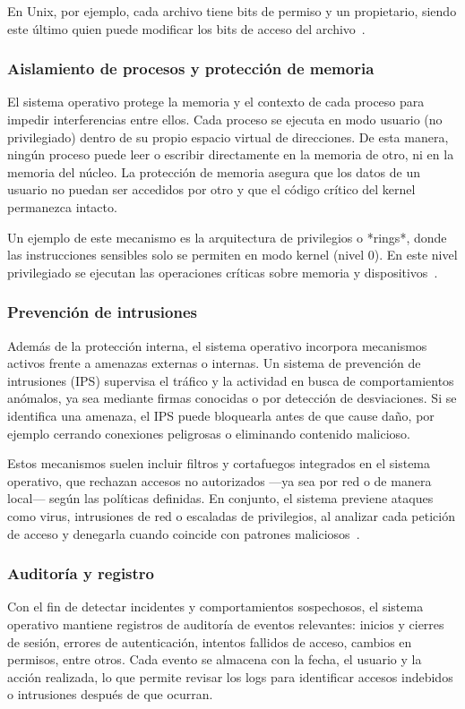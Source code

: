 En Unix, por ejemplo, cada archivo tiene bits de permiso y un propietario, siendo este último quien puede modificar los bits de acceso del archivo~\citep{columbia2008}.
\subsubsection{Aislamiento de procesos y protección de memoria}
El sistema operativo protege la memoria y el contexto de cada proceso para impedir interferencias entre ellos. Cada proceso se ejecuta en modo usuario (no privilegiado) dentro de su propio espacio virtual de direcciones.  
De esta manera, ningún proceso puede leer o escribir directamente en la memoria de otro, ni en la memoria del núcleo.  
La protección de memoria asegura que los datos de un usuario no puedan ser accedidos por otro y que el código crítico del kernel permanezca intacto.  

Un ejemplo de este mecanismo es la arquitectura de privilegios o *rings*, donde las instrucciones sensibles solo se permiten en modo kernel (nivel 0).  
En este nivel privilegiado se ejecutan las operaciones críticas sobre memoria y dispositivos~\citep{princeton2018}.

\subsubsection{Prevención de intrusiones}
Además de la protección interna, el sistema operativo incorpora mecanismos activos frente a amenazas externas o internas.  
Un sistema de prevención de intrusiones (IPS) supervisa el tráfico y la actividad en busca de comportamientos anómalos, ya sea mediante firmas conocidas o por detección de desviaciones.  
Si se identifica una amenaza, el IPS puede bloquearla antes de que cause daño, por ejemplo cerrando conexiones peligrosas o eliminando contenido malicioso.  

Estos mecanismos suelen incluir filtros y cortafuegos integrados en el sistema operativo, que rechazan accesos no autorizados —ya sea por red o de manera local— según las políticas definidas.  
En conjunto, el sistema previene ataques como virus, intrusiones de red o escaladas de privilegios, al analizar cada petición de acceso y denegarla cuando coincide con patrones maliciosos~\citep{ibm2019}.

\subsubsection{Auditoría y registro}
Con el fin de detectar incidentes y comportamientos sospechosos, el sistema operativo mantiene registros de auditoría de eventos relevantes: inicios y cierres de sesión, errores de autenticación, intentos fallidos de acceso, cambios en permisos, entre otros.  
Cada evento se almacena con la fecha, el usuario y la acción realizada, lo que permite revisar los logs para identificar accesos indebidos o intrusiones después de que ocurran.  

